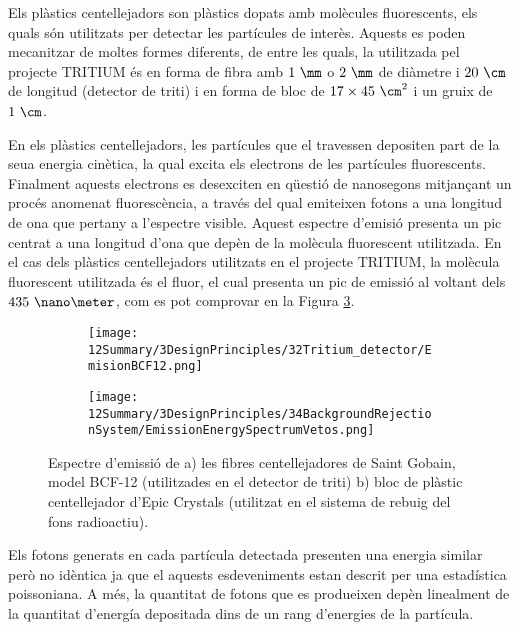 Els plàstics centellejadors son plàstics dopats amb molècules fluorescents, els quals són utilitzats per detectar les partícules de interès. Aquests es poden mecanitzar de moltes formes diferents, de entre les quals, la utilitzada pel projecte TRITIUM és en forma de fibra amb $1~\mm$ o $2~\mm$ de diàmetre i $20~\cm$ de longitud (detector de triti) i en forma de bloc de $17\times 45~\cm^2$ i un gruix de $1~\cm$. 

En els plàstics centellejadors, les partícules que el travessen depositen part de la seua energia cinètica, la qual excita els electrons de les partícules fluorescents. Finalment aquests electrons es desexciten en qüestió de nanosegons mitjançant un procés anomenat fluorescència, a través del qual emiteixen fotons a una longitud de ona que pertany a l'espectre visible. Aquest espectre d'emisió presenta un pic centrat a una longitud d'ona que depèn de la molècula fluorescent utilitzada. En el cas dels plàstics centellejadors utilitzats en el projecte TRITIUM, la molècula fluorescent utilitzada és el fluor, el cual presenta un pic de emissió al voltant dels $435~\nano\meter$, com es pot comprovar en la Figura \ref{fig:EspectreEmisioPlasticsTRITIUM}.

\begin{figure}
\centering
    \begin{subfigure}[b]{0.7\textwidth}
    \centering
    \texttt{[image: 12Summary/3DesignPrinciples/32Tritium\_detector/EmisionBCF12.png]}  
        \caption{}\label{subfig:EspectreEmisioFibres}
    \end{subfigure}
    \hfill
    \begin{subfigure}[b]{0.7\textwidth}
    \centering
    \texttt{[image: 12Summary/3DesignPrinciples/34BackgroundRejectionSystem/EmissionEnergySpectrumVetos.png]}  
    \caption{\label{subfig:EspectreEmisioVeto}}
    \end{subfigure}
\caption{Espectre d'emissió de a) les fibres centellejadores de Saint Gobain, model BCF-12 (utilitzades en el detector de triti) \cite{DataSheetBCF12Fiber} b) bloc de plàstic centellejador d'Epic Crystals (utilitzat en el sistema de rebuig del fons radioactiu)\cite{ScintillatorVeto}\label{fig:EspectreEmisioPlasticsTRITIUM}.}
\end{figure}

Els fotons generats en cada partícula detectada presenten una energia similar però no idèntica ja que el aquests esdeveniments estan descrit per una estadística poissoniana. A més, la quantitat de fotons que es produeixen depèn linealment de la quantitat d'energía depositada dins de un rang d'energies de la partícula.

